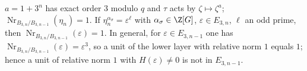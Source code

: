 $a=1+3^n$ has exact order $3$ modulo $q$ and $\tau$ acts by $\zeta\mapsto\zeta^{a}$; $\operatorname{Nr}_{B_{3,n}/B_{3,n-1}}(\eta_n)=1$. If $\eta_n^{\alpha_\sigma}=\varepsilon^{\ell}$ with $\alpha_\sigma\in\Z[G]$, $\varepsilon\in E_{3,n}$, $\ell$ an odd prime, then $\operatorname{Nr}_{B_{3,n}/B_{3,n-1}}(\varepsilon)=1$. In general, for $\varepsilon\in E_{3,n-1}$ one has $\operatorname{Nr}_{B_{3,n}/B_{3,n-1}}(\varepsilon)=\varepsilon^3$, so a unit of the lower layer with relative norm $1$ equals $1$; hence a unit of relative norm $1$ with $H(\varepsilon)\ne0$ is not in $E_{3,n-1}$.
